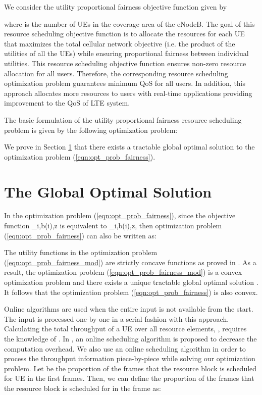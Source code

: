 \documentclass[conference]{IEEEtran}
\begin{document}
We consider the utility proportional fairness objective function given by 

where  is the number of UEs in the coverage area of the eNodeB. The goal of this resource scheduling objective function is to allocate the resources for each UE that maximizes the total cellular network objective (i.e. the product of the utilities of all the UEs) while ensuring proportional fairness between individual utilities. This resource scheduling objective function ensures non-zero resource allocation for all users. Therefore, the corresponding resource scheduling optimization problem guarantees minimum QoS for all users. In addition, this approach allocates more resources to users with real-time applications providing improvement to the QoS of LTE system. 


The basic formulation of the utility proportional fairness resource scheduling problem is given by the following optimization problem:

We prove in Section \ref{sec:Proof} that there exists a tractable global optimal solution to the optimization problem (\ref{eqn:opt_prob_fairness}).

\section{The Global Optimal Solution}\label{sec:Proof}

In the optimization problem (\ref{eqn:opt_prob_fairness}), since the objective function \phi_{i,b(i),z} is equivalent to \phi_{i,b(i),z}, then optimization problem (\ref{eqn:opt_prob_fairness}) can also be written as:



The utility functions  in the optimization problem (\ref{eqn:opt_prob_fairness_mod}) are strictly concave functions as proved in \cite{Ahmed_Utility1}. As a result, the optimization problem (\ref{eqn:opt_prob_fairness_mod}) is a convex optimization problem and there exists a unique tractable global optimal solution \cite{Ahmed_Utility1}. It follows that the optimization problem (\ref{eqn:opt_prob_fairness}) is also convex. 

Online algorithms are used when the entire input is not available from the start. The input is processed one-by-one in a serial fashion with this approach. Calculating the total throughput of a UE over all resource elements, , requires the knowledge of . In \cite{SelfOrganizedLTE}, an online scheduling algorithm is proposed to decrease the computation overhead. We also use an online scheduling algorithm in order to process the throughput information piece-by-piece while solving our optimization problem.
Let  be the proportion of the frames that the resource block  is scheduled for UE  in the first  frames. Then, we can define the proportion of the frames that the resource block  is scheduled for  in the  frame as:
\end{document}
